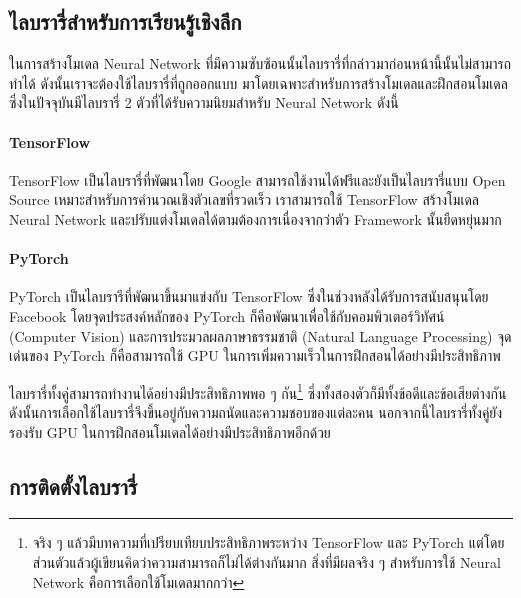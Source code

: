 \subsection{ไลบรารี่สำหรับการเรียนรู้เชิงลึก}
\label{ssec:lib_dl}

ในการสร้างโมเดล Neural Network ที่มีความซับซ้อนนั้นไลบรารี่ที่กล่าวมาก่อนหน้านี้นั้นไม่สามารถทำได้ ดังนั้นเราจะต้องใช้ไลบรารี่ที่ถูกออกแบบ%
มาโดยเฉพาะสำหรับการสร้างโมเดลและฝึกสอนโมเดล ซึ่งในปัจจุบันมีไลบรารี่ 2 ตัวที่ได้รับความนิยมสำหรับ Neural Network ดังนี้

\paragraph{TensorFlow}
TensorFlow เป็นไลบรารี่ที่พัฒนาโดย Google สามารถใช้งานได้ฟรีและยังเป็นไลบรารี่แบบ Open Source เหมาะสำหรับการคำนวณเชิงตัวเลขที่รวดเร็ว 
เราสามารถใช้ TensorFlow สร้างโมเดล Neural Network และปรับแต่งโมเดลได้ตามต้องการเนื่องจากว่าตัว Framework นั้นยืดหยุ่นมาก

\paragraph{PyTorch} 
PyTorch เป็นไลบรารีที่พัฒนาขึ้นมาแข่งกับ TensorFlow ซึ่งในช่วงหลังได้รับการสนับสนุนโดย Facebook โดยจุดประสงค์หลักของ PyTorch 
ก็คือพัฒนาเพื่อใช้กับคอมพิวเตอร์วิทัศน์ (Computer Vision) และการประมวลผลภาษาธรรมชาติ (Natural Language Processing) 
จุดเด่นของ PyTorch ก็คือสามารถใช้ GPU ในการเพิ่มความเร็วในการฝึกสอนได้อย่างมีประสิทธิภาพ

ไลบรารี่ทั้งคู่สามารถทำงานได้อย่างมีประสิทธิภาพพอ ๆ กัน\footnote{จริง ๆ แล้วมีบทความที่เปรียบเทียบประสิทธิภาพระหว่าง TensorFlow และ 
PyTorch แต่โดยส่วนตัวแล้วผู้เขียนคิดว่าความสามารถก็ไม่ได้ต่างกันมาก สิ่งที่มีผลจริง ๆ สำหรับการใช้ Neural Network คือการเลือกใช้โมเดลมากกว่า}
ซึ่งทั้งสองตัวก็มีทั้งข้อดีและข้อเสียต่างกัน ดังนั้นการเลือกใช้ไลบรารี่จึงขึ้นอยู่กับความถนัดและความชอบของแต่ละคน นอกจากนี้ไลบรารี่ทั้งคู่ยังรองรับ
GPU ในการฝึกสอนโมเดลได้อย่างมีประสิทธิภาพอีกด้วย

\subsection{การติดตั้งไลบรารี่}
\label{ssec:install_lib_dl}

